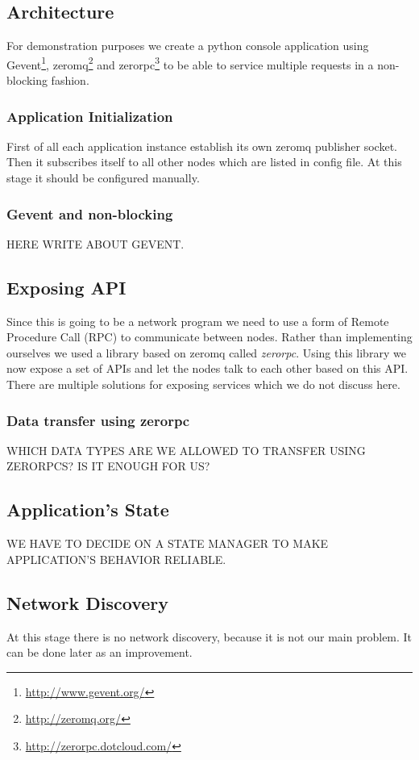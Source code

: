 \subsection{Architecture}
For demonstration purposes we create a python console application using Gevent\footnote{\url{http://www.gevent.org/}}, zeromq\footnote{\url{http://zeromq.org/}} and zerorpc\footnote{\url{http://zerorpc.dotcloud.com/}} to be able to service multiple requests in a non-blocking fashion.

\subsubsection{Application Initialization}
First of all each application instance establish its own zeromq publisher socket. Then it subscribes itself to all other nodes which are listed in config file. At this stage it should be configured manually.

\subsubsection{Gevent and non-blocking}
HERE WRITE ABOUT GEVENT.

\subsection{Exposing API}
Since this is going to be a network program we need to use a form of Remote Procedure Call (RPC) to communicate between nodes. Rather than implementing ourselves we used a library based on zeromq called \textit{zerorpc}. Using this library we now expose a set of APIs and let the nodes talk to each other based on this API. There are multiple solutions for exposing services which we do not discuss here.

\subsubsection{Data transfer using zerorpc}
WHICH DATA TYPES ARE WE ALLOWED TO TRANSFER USING ZERORPCS? IS IT ENOUGH FOR US?

\subsection{Application's State}
WE HAVE TO DECIDE ON A STATE MANAGER TO MAKE APPLICATION'S BEHAVIOR RELIABLE.

\subsection{Network Discovery}
At this stage there is no network discovery, because it is not our main problem. It can be done later as an improvement.

